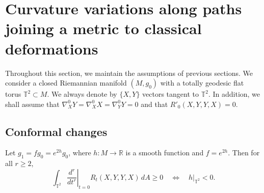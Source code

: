 \documentclass[graybox]{svmult}
\begin{document}
\section{Curvature variations along paths joining a metric to classical deformations}\label{sec:4}



Throughout this section, we maintain the assumptions of previous sections. We consider a closed Riemannian manifold $(M,g_0)$ with a totally geodesic flat torus $\mathbb{T}^2 \subset M$. We always denote by $\{X,Y\}$ vectors tangent to $\mathbb{T}^2.$ In addition, we shall assume that $\nabla^0_XY = \nabla^0_XX = \nabla^0_YY = 0$ and that $R'_0(X,Y,Y,X)=0$.


\subsection{Conformal changes}

\begin{proposition}\label{prop:conformal}
Let $g_1 = f g_0 = e^{2h} g_0$, where $h : M \to \mathbb{R}$ is a smooth function and $f = e^{2h}$. Then for all $r \geq 2$,
\[
\int_{\mathbb{T}^2} \left.\frac{d^r}{dt^r}\right|_{t=0} R_t(X,Y,Y,X) \, dA \geq 0 \quad\Longleftrightarrow\quad  h|_{\mathbb{T}^2}<0.
\]
\end{proposition}
\end{document}
